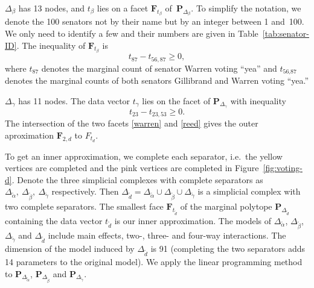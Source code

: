 \documentclass[aos,noinfoline]{imsart}
\newcommand{\Fbf}{\mathbf{F}}
\newcommand{\Pbf}{\mathbf{P}}
\theoremstyle{remark}
\theoremstyle{definition}
\begin{document}
$\Delta_{\beta}$ has 13 nodes, %
and $t_{\beta}$ lies on a facet $\Fbf_{t_{\beta}}$ of~$\Pbf_{\Delta_{\beta}}$.
To simplify the notation, we denote the 100 senators not by their name but by an integer between 1 and~100. We
only need to identify a few and their numbers are given in Table~\ref{tab:senator-ID}.
The inequality of $\Fbf_{t_{\beta}}$ is
\begin{equation}
  \label{warren}
  t_{87}-t_{56,87} \ge 0,
\end{equation}
where $t_{\text{87}}$ denotes the marginal count of senator Warren voting ``yea'' and $t_{\text{56},\text{87}}$ denotes the marginal counts of both senators Gillibrand and Warren voting ``yea.''

$\Delta_\gamma$ has 11 nodes.%
The data vector $t_{\gamma}$ lies on the facet of $\Pbf_{\Delta_{\gamma}}$ with inequality
\begin{equation}
  \label{reed}
  t_{23}-t_{23,53} \ge 0.
\end{equation}
The intersection of the two facets \eqref{warren} and \eqref{reed} gives the outer aproximation $\Fbf_{2,d}$ to $F_{t_{d}}$.

To get an inner approximation, we complete each separator, i.e.\ the yellow vertices are completed and the pink vertices are completed in Figure~\ref{fig:voting-d}.  Denote the three simplicial complexes with complete separators as $\Delta_{\tilde{\alpha}},\ \Delta_{\tilde{\beta}},\ \Delta_{\tilde{\gamma}}$ respectively.  Then $\Delta_{\tilde{d}}=\Delta_{\tilde{\alpha}} \cup \Delta_{\tilde{\beta}} \cup \Delta_{\tilde{\gamma}}$ is a simplicial complex with two complete separators. The smallest face $\Fbf_{t_{\tilde{d}}}$ of the marginal polytope $\Pbf_{\Delta_{\tilde{d}}}$ containing the data vector $t_{\tilde{d}}$ is our inner approximation.  The models of $\Delta_{\tilde{\alpha}}$, $\Delta_{\tilde{\beta}}$, $\Delta_{\tilde{\gamma}}$ and $\Delta_{\tilde{d}}$ include main effects,  two-, three- and four-way interactions.  The dimension of the model induced by $\Delta_{\tilde{d}}$ is  91 (completing the two separators adds 14 parameters to the original model).  We apply the linear programming method to  $\Pbf_{\Delta_{\tilde{\alpha}}}$, $\Pbf_{\Delta_{\tilde{\beta}}}$ and $\Pbf_{\Delta_{\tilde{\gamma}}}$.
\end{document}
